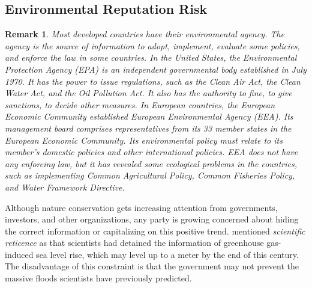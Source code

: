 \documentclass[sn-basic]{sn-jnl}%
\theoremstyle{thmstyleone}%
\theoremstyle{thmstyletwo}%
\newtheorem{remark}{Remark}%
\theoremstyle{thmstylethree}%
\begin{document}
\subsection{Environmental Reputation Risk}
\begin{remark}
	Most developed countries have their environmental agency. The agency is the source of information to adopt, implement, evaluate some policies, and enforce the law in some countries. In the United States, the Environmental Protection Agency (EPA) is an independent governmental body established in July 1970. It has the power to issue regulations, such as the Clean Air Act, the Clean Water Act, and the Oil Pollution Act. It also has the authority to fine, to give sanctions, to decide other measures. In European countries, the European Economic Community established European Environmental Agency (EEA). Its management board comprises representatives from its 33 member states in the European Economic Community. Its environmental policy must relate to its member’s domestic policies and other international policies. EEA does not have any enforcing law, but it has revealed some ecological problems in the countries, such as implementing Common Agricultural Policy, Common Fisheries Policy, and Water Framework Directive. 
\end{remark}

Although nature conservation gets increasing attention from governments, investors, and other organizations, any party is growing concerned about hiding the correct information or capitalizing on this positive trend. \citet{hansen2007scientific} mentioned \emph{scientific reticence} as that scientists had detained the information of greenhouse gas-induced sea level rise, which may level up to a meter by the end of this century. The disadvantage of this constraint is that the government may not prevent the massive floods scientists have previously predicted.
\end{document}
